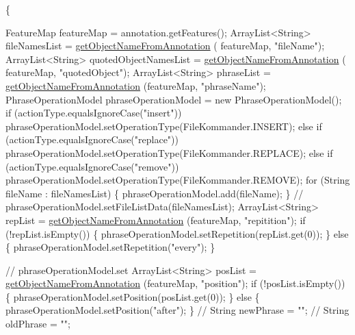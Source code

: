 \begin{DoxyCode}
                                                      \{

        FeatureMap featureMap = annotation.getFeatures();
        ArrayList<String> fileNamesList = \hyperlink{classcom_1_1poly_1_1nlp_1_1filekommander_1_1file_1_1actions_1_1_analyse_action_a8652e1bba48585a8c416e6e212fe4766}{getObjectNameFromAnnotation}
      (
                featureMap, \textcolor{stringliteral}{"fileName"});
        ArrayList<String> quotedObjectNamesList = \hyperlink{classcom_1_1poly_1_1nlp_1_1filekommander_1_1file_1_1actions_1_1_analyse_action_a8652e1bba48585a8c416e6e212fe4766}{getObjectNameFromAnnotation}
      (
                featureMap, \textcolor{stringliteral}{"quotedObject"});
        ArrayList<String> phraseList = \hyperlink{classcom_1_1poly_1_1nlp_1_1filekommander_1_1file_1_1actions_1_1_analyse_action_a8652e1bba48585a8c416e6e212fe4766}{getObjectNameFromAnnotation}
      (featureMap,
                \textcolor{stringliteral}{"phraseName"});
        PhraseOperationModel phraseOperationModel = \textcolor{keyword}{new} PhraseOperationModel();
        \textcolor{keywordflow}{if} (actionType.equalsIgnoreCase(\textcolor{stringliteral}{"insert"}))
            phraseOperationModel.setOperationType(FileKommander.INSERT);
        \textcolor{keywordflow}{else} \textcolor{keywordflow}{if} (actionType.equalsIgnoreCase(\textcolor{stringliteral}{"replace"}))
            phraseOperationModel.setOperationType(FileKommander.REPLACE);
        \textcolor{keywordflow}{else} \textcolor{keywordflow}{if} (actionType.equalsIgnoreCase(\textcolor{stringliteral}{"remove"}))
            phraseOperationModel.setOperationType(FileKommander.REMOVE);
        \textcolor{keywordflow}{for} (String fileName : fileNamesList) \{
            phraseOperationModel.add(fileName);
        \}
        \textcolor{comment}{// phraseOperationModel.setFileListData(fileNamesList);}
        ArrayList<String> repList = \hyperlink{classcom_1_1poly_1_1nlp_1_1filekommander_1_1file_1_1actions_1_1_analyse_action_a8652e1bba48585a8c416e6e212fe4766}{getObjectNameFromAnnotation}
      (featureMap,
                \textcolor{stringliteral}{"repitition"});
        \textcolor{keywordflow}{if} (!repList.isEmpty()) \{
            phraseOperationModel.setRepetition(repList.get(0));
        \} \textcolor{keywordflow}{else} \{
            phraseOperationModel.setRepetition(\textcolor{stringliteral}{"every"});
        \}

        \textcolor{comment}{// phraseOperationModel.set}
        ArrayList<String> posList = \hyperlink{classcom_1_1poly_1_1nlp_1_1filekommander_1_1file_1_1actions_1_1_analyse_action_a8652e1bba48585a8c416e6e212fe4766}{getObjectNameFromAnnotation}
      (featureMap,
                \textcolor{stringliteral}{"position"});
        \textcolor{keywordflow}{if} (!posList.isEmpty()) \{
            phraseOperationModel.setPosition(posList.get(0));
        \} \textcolor{keywordflow}{else} \{
            phraseOperationModel.setPosition(\textcolor{stringliteral}{"after"});
        \}
        \textcolor{comment}{// String newPhrase = "";}
        \textcolor{comment}{// String oldPhrase = "";}


\end{DoxyCode}
